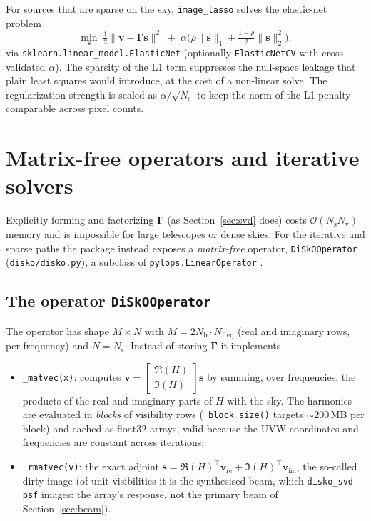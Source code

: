 \documentclass[11pt,a4paper]{article}
\newcommand{\Ns}{N_{\mathrm{s}}}
\newcommand{\Nv}{N_{\mathrm{v}}}
\newcommand{\Nb}{N_{\mathrm{b}}}
\newcommand{\Gammam}{\boldsymbol{\Gamma}}
\newcommand{\svec}{\boldsymbol{s}}
\newcommand{\vvec}{\boldsymbol{v}}
\begin{document}
For sources that are sparse on the sky, \texttt{image\_lasso} solves the
elastic-net problem
\begin{equation}
  \min_{\svec}\; \tfrac12\|\vvec-\Gammam\svec\|^2
  \;+\; \alpha\Big(\rho\|\svec\|_1 + \tfrac{1-\rho}{2}\|\svec\|_2^2\Big),
\end{equation}
via \texttt{sklearn.linear\_model.ElasticNet} (optionally
\texttt{ElasticNetCV} with cross-validated $\alpha$). The sparsity of the L1
term suppresses the null-space leakage that plain least squares would
introduce, at the cost of a non-linear solve. The regularization strength is
scaled as $\alpha/\sqrt{\Ns}$ to keep the norm of the L1 penalty comparable
across pixel counts.

\section{Matrix-free operators and iterative solvers}
\label{sec:matrixfree}

Explicitly forming and factorizing $\Gammam$ (as
Section~\ref{sec:svd} does) costs $\mathcal{O}(\Ns\Nv)$ memory and is
impossible for large telescopes or dense skies. For the iterative and sparse
paths the package instead exposes a \emph{matrix-free} operator,
\texttt{DiSkOOperator} (\texttt{disko/disko.py}), a subclass of
\texttt{pylops.LinearOperator} \cite{pylops2018}.

\subsection{The operator \texttt{DiSkOOperator}}

The operator has shape $M\times N$ with $M=2\Nb\cdot N_{\mathrm{freq}}$ (real
and imaginary rows, per frequency) and $N=\Ns$. Instead of storing $\Gammam$
it implements

\begin{itemize}
  \item \texttt{\_matvec(x)}: computes
    $\vvec = \begin{bmatrix}\Re(H)\\ \Im(H)\end{bmatrix}\svec$ by summing, over
    frequencies, the products of the real and imaginary parts of $H$ with the
    sky. The harmonics are evaluated in \emph{blocks} of visibility rows
    (\texttt{\_block\_size()} targets $\sim$200\,MB per block) and cached as
    float32 arrays, valid because the UVW coordinates and frequencies are
    constant across iterations;
  \item \texttt{\_rmatvec(v)}: the exact adjoint
    $\svec = \Re(H)^{\!\top}\vvec_{\mathrm{re}}+
    \Im(H)^{\!\top}\vvec_{\mathrm{im}}$, the so-called dirty image (of unit
    visibilities it is the synthesised beam, which \texttt{disko\_svd --psf}
    images: the array's response, not the primary beam of
    Section~\ref{sec:beam}).
\end{itemize}
\end{document}
